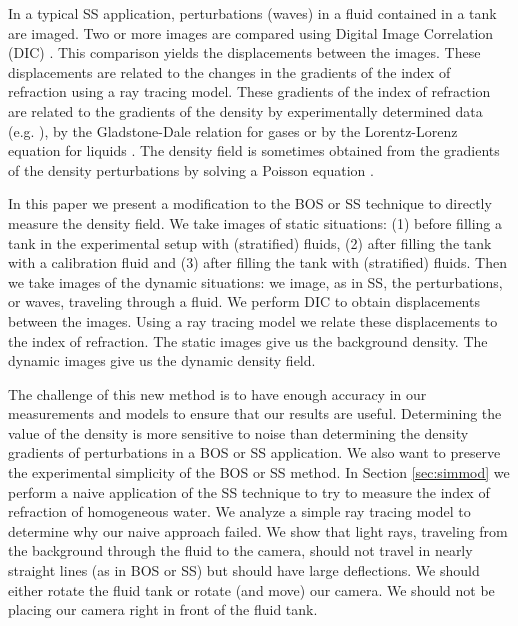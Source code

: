 \documentclass{svjour3}                     %
\begin{document}
In a typical SS application, perturbations (waves) in a fluid contained in a tank are imaged. Two or more images are compared using Digital Image Correlation (DIC) \cite{sutton2009image}. This comparison yields the displacements between the images. These displacements are related to the changes in the gradients of the index of refraction using a ray tracing model. These gradients of the index of refraction are related to the gradients of the density by experimentally determined data (e.g. \cite{tan2015dependence}), by the Gladstone-Dale relation for gases \cite{born2013principles} or by the Lorentz-Lorenz equation for liquids \cite{lorentz1916theory}. The density field is sometimes obtained from the gradients of the density perturbations by solving a Poisson equation \cite{venkatakrishnan2004density, verso2015background}.

In this paper we present a modification to the BOS or SS technique to directly measure the density field. We take images of static situations:  (1) before filling a tank in the experimental setup with (stratified) fluids, (2) after filling the tank with a calibration fluid and (3) after filling the tank with (stratified) fluids. Then we take images of the dynamic situations: we image, as in SS, the perturbations, or waves, traveling through a fluid. We perform DIC to obtain displacements between the images. Using a ray tracing model we relate these displacements to the index of refraction. The static images give us the background density. The dynamic images give us the dynamic density field.

The challenge of this new method is to have enough accuracy in our measurements and models to ensure that our results are useful. Determining the value of the density is more sensitive to noise than determining the density gradients of perturbations in a BOS or SS application. We also want to preserve the experimental simplicity of the BOS or SS method. In Section \ref{sec:simmod} we perform a naive application of the SS technique to try to measure the index of refraction of homogeneous water. We analyze a simple ray tracing model to determine why our naive approach failed. We show that light rays, traveling from the background through the fluid to the camera, should not travel in nearly straight lines (as in BOS or SS) but should have large deflections. We should either rotate the fluid tank or rotate (and move) our camera. We should not be placing our camera right in front of the fluid tank. 
\end{document}

